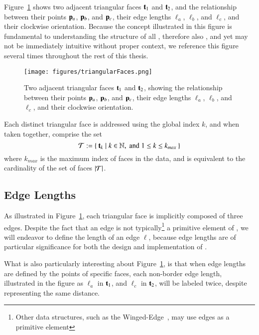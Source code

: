 Figure~\ref{fig:triangularFaces} shows two adjacent triangular faces $\mathbf{t}_1$ and $\mathbf{t}_2$, and the relationship between their points $\mathbf{p}_a$, $\mathbf{p}_b$, and $\mathbf{p}_c$, their edge lengths $\ell_a$, $\ell_b$, and $\ell_c$, and their clockwise orientation. Because the concept illustrated in this figure is fundamental to understanding the structure of all \tdd{}, therefore also , and yet may not be immediately intuitive without proper context, we reference this figure several times throughout the rest of this thesis.

\begin{figure}[ht]
\ffigbox
	{\texttt{[image: figures/triangularFaces.png]}}
	{\caption[Two Triangular Faces]{Two adjacent triangular faces $\mathbf{t}_1$ and $\mathbf{t}_2$, showing the relationship between their points $\mathbf{p}_a$, $\mathbf{p}_b$, and $\mathbf{p}_c$, their edge lengths $\ell_a$, $\ell_b$, and $\ell_c$, and their clockwise orientation.}\label{fig:triangularFaces}}
\end{figure}

Each distinct triangular face is addressed using the global index $k$, and when taken together, comprise the set
%
\begin{equation}
	\mathcal{T} := \left \{\:\mathbf{t}_k \mid k \in \mathbb{N}, \;\text{and}\; 1\leq k \leq k_{max}\:\right \}
	\label{eq:defineSetOfFaces}
\end{equation}
%
where $k_{max}$ is the maximum index of faces in the data, and is equivalent to the cardinality of the set of faces $|\mathcal{T}|$.%
%
%

%
%
%
%
\subsection{Edge Lengths}
\label{ch2sTDDssEL}
As illustrated in Figure~\ref{fig:triangularFaces}, each triangular face is implicitly composed of three edges. Despite the fact that an edge is not typically\footnote{Other data structures, such as the Winged-Edge~\cite[p.~1]{Baumgart75}, may use edges as a primitive element} a primitive element of \tdd{}, we will endeavor to define the length of an edge $\ell$, because edge lengths are of particular significance for both the design and implementation of .

What is also particularly interesting about Figure~\ref{fig:triangularFaces}, is that when edge lengths are defined by the points of specific faces, each non-border edge length, illustrated in the figure as $\ell_a$ in $\mathbf{t}_1$, and $\ell_c$ in $\mathbf{t}_2$, will be labeled twice, despite representing the same distance.

